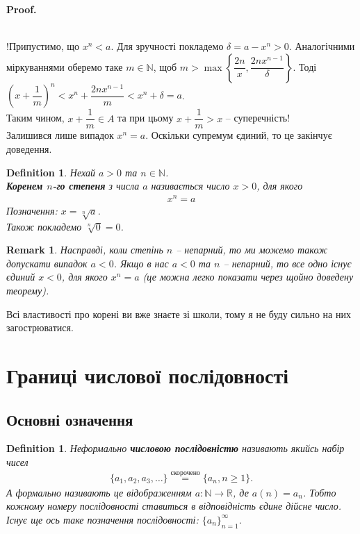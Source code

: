 \documentclass[a4paper, 14pt]{article}
\makeatletter
\def\qed{$\blacksquare$}
\theoremstyle{theoremdd}
\theoremstyle{theoremdd}
\newtheorem{definition}[theorem]{Definition}
\theoremstyle{theoremdd}
\theoremstyle{theoremdd}
\theoremstyle{theoremdd}
\theoremstyle{theoremdd}
\newtheorem{remark}[theorem]{Remark}
\theoremstyle{theoremdd}
\theoremstyle{theoremdd}
\renewenvironment{proof}[1][Proof.\\]{\par
\pushQED{\hfill \qed}%
\normalfont \topsep6\p@\@plus6\p@\relax
\trivlist
\item\relax
{\bfseries
#1\@addpunct{.}}\hspace\labelsep\ignorespaces
}{%
\popQED\endtrivlist\@endpefalse
}
\makeatother
\begin{document}
\begin{proof}
	\bigskip \\
	!Припустимо, що $x^n < a$. Для зручності покладемо $\delta = a - x^n > 0$. Аналогічними міркуваннями оберемо таке $m \in \mathbb{N}$, щоб $m > \max\left\{ \dfrac{2n}{x}, \dfrac{2nx^{n-1}}{\delta} \right\}$. Тоді\\
	$\left( x + \dfrac{1}{m} \right)^n < x^n + \dfrac{2nx^{n-1}}{m} < x^n + \delta = a$.\\
	Таким чином, $x + \dfrac{1}{m} \in A$ та при цьому $x + \dfrac{1}{m} > x$ -- суперечність!
	\bigskip \\
	Залишився лише випадок $x^n = a$. Оскільки супремум єдиний, то це закінчує доведення.
	\end{proof}
	
	\begin{definition}
	Нехай $a > 0$ та $n \in \mathbb{N}$.\\
	\textbf{Коренем $n$-го степеня} з числа $a$ називається число $x > 0$, для якого
	\begin{align*}
	x^n = a
	\end{align*}
	Позначення: $x = \sqrt[n]{a}$.\\
	Також покладемо $\sqrt[n]{0} = 0$.
	\end{definition}
	
	\begin{remark}
	Насправді, коли степінь $n$ -- непарний, то ми можемо також допускати випадок $a < 0$. Якщо в нас $a < 0$ та $n$ -- непарний, то все одно існує єдиний $x < 0$, для якого $x^n = a$ (це можна легко показати через щойно доведену теорему).
	\end{remark}
	
	Всі властивості про корені ви вже знаєте зі школи, тому я не буду сильно на них загострюватися.
	\newpage
	
	\setcounter{section}{2}
	\section{Границі числової послідовності}
	\subsection{Основні означення}
	\begin{definition}
	Неформально \textbf{числовою послідовністю} називають якийсь набір чисел 
	\begin{align*}
	\{a_1,a_2,a_3, \dots\} \overset{\text{скорочено}}{=} \{a_n, n \geq 1\}.
	\end{align*}
	А формально називають це відображенням $a \colon \mathbb{N} \to \mathbb{R}$, де $a(n) = a_n$. Тобто кожному номеру послідовності ставиться в відповідність єдине дійсне число.\\
	Існує ще ось таке позначення послідовності: $\{a_n\}_{n=1}^\infty$.
	\end{definition}
	
\end{document}
